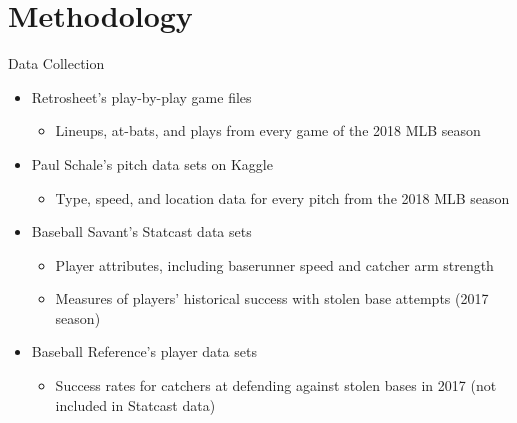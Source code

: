 \documentclass[10pt]{beamer}
\begin{document}
\section{Methodology}
\begin{frame}{Data Collection}
\begin{itemize}
    \item Retrosheet's play-by-play game files
    \begin{itemize}
        \item Lineups, at-bats, and plays from every game of the 2018 MLB season

    \end{itemize}
    \vspace{3mm}
    \item Paul Schale's pitch data sets on Kaggle
    \begin{itemize}
        \item Type, speed, and location data for every pitch from the 2018 MLB season

    \end{itemize}
    \vspace{3mm}
    \item Baseball Savant's Statcast data sets
    \begin{itemize}
        \item Player attributes, including baserunner speed and catcher arm strength

        \item Measures of players' historical success with stolen base attempts (2017 season)
    \end{itemize}
    \vspace{3mm}
    \item Baseball Reference's player data sets
    \begin{itemize}
        \item Success rates for catchers at defending against stolen bases in 2017 (not included in Statcast data)
    \end{itemize}
\end{itemize}
\end{frame}
\end{document}
